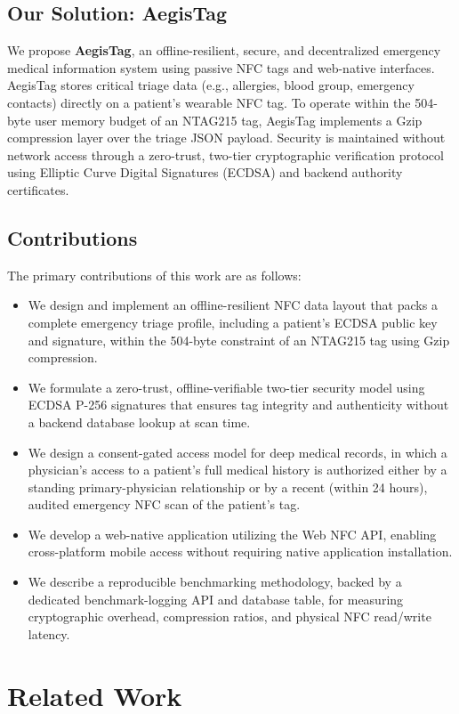 \documentclass[conference]{IEEEtran}
\begin{document}
\subsection{Our Solution: AegisTag}
We propose \textbf{AegisTag}, an offline-resilient, secure, and decentralized emergency medical information system using passive NFC tags and web-native interfaces. AegisTag stores critical triage data (e.g., allergies, blood group, emergency contacts) directly on a patient's wearable NFC tag. To operate within the 504-byte user memory budget of an NTAG215 tag, AegisTag implements a Gzip compression layer over the triage JSON payload. Security is maintained without network access through a zero-trust, two-tier cryptographic verification protocol using Elliptic Curve Digital Signatures (ECDSA) and backend authority certificates.

\subsection{Contributions}
The primary contributions of this work are as follows:
\begin{itemize}
\item We design and implement an offline-resilient NFC data layout that packs a complete emergency triage profile, including a patient's ECDSA public key and signature, within the 504-byte constraint of an NTAG215 tag using Gzip compression.
\item We formulate a zero-trust, offline-verifiable two-tier security model using ECDSA P-256 signatures that ensures tag integrity and authenticity without a backend database lookup at scan time.
\item We design a consent-gated access model for deep medical records, in which a physician's access to a patient's full medical history is authorized either by a standing primary-physician relationship or by a recent (within 24 hours), audited emergency NFC scan of the patient's tag.
\item We develop a web-native application utilizing the Web NFC API, enabling cross-platform mobile access without requiring native application installation.
\item We describe a reproducible benchmarking methodology, backed by a dedicated benchmark-logging API and database table, for measuring cryptographic overhead, compression ratios, and physical NFC read/write latency.
\end{itemize}

\section{Related Work}
\end{document}
